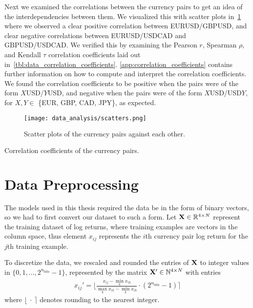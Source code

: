 Next we examined the correlations between the currency pairs to get an idea of the interdependencies between them.
We visualized this with scatter plots in~\cref{fig:scatters} where we observed a clear positive correlation between EURUSD/GBPUSD, and clear negative correlations between EURUSD/USDCAD and GBPUSD/USDCAD.
We verified this by examining the Pearson \( r \), Spearman \( \rho \), and Kendall \( \tau \) correlation coefficients laid out in~\cref{tbl:data_correlation_coefficients}.
\cref{app:correlation_coefficients} contains further information on how to compute and interpret the correlation coefficients.
We found the correlation coefficients to be positive when the pairs were of the form \( X \)USD/\( Y \)USD, and negative when the pairs were of the form \( X \)USD/USD\( Y \), for \( X,Y \in \) \{EUR, GBP, CAD, JPY\}, as expected.
\begin{figure}[!htb]
    \begin{center}
        \texttt{[image: data\_analysis/scatters.png]}
    \end{center}
    \caption{Scatter plots of the currency pairs against each other.}
    \label{fig:scatters}
\end{figure}

\begin{table}[!htb]
    \centering
    \begin{adjustbox}{max width=\textwidth}
        
    \end{adjustbox}
    \caption{Correlation coefficients of the currency pairs.}
    \label{tbl:data_correlation_coefficients}
\end{table}


\section{Data Preprocessing}
The models used in this thesis required the data be in the form of binary vectors, so we had to first convert our dataset to such a form.
Let \( \mathbf{X} \in \mathbb{R}^{4 \times N} \) represent the training dataset of log returns, where training examples are vectors in the column space, thus element \( x_{ij} \) represents the \( i \)th currency pair log return for the \( j \)th training example.

To discretize the data, we rescaled and rounded the entries of \( \mathbf{X} \) to integer values in \( \{0, 1, \dots, 2^{n_\text{bits}} - 1\} \), represented by the matrix \( \mathbf{X}' \in \mathbb{N}^{4 \times N} \) with entries
\begin{align}
    x_{ij}' = \bigg\lfloor \frac{x_{ij} - \min_k x_{ik}}{\max_k x_{ik} - \min_k x_{ik}} \cdot (2^{n_\text{bits}} - 1) \bigg\rceil
\end{align}
where \( \lfloor \ \cdot \ \rceil \) denotes rounding to the nearest integer.

